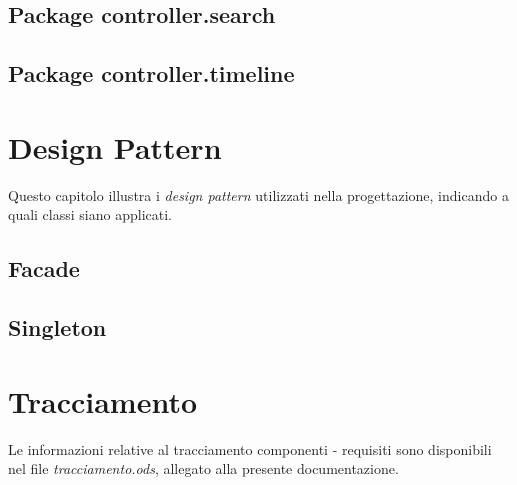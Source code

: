 \documentclass[10pt,a4paper,headinclude,footinclude,hidelinks]{scrreprt} %
\begin{document}
	\section{Package controller.search}
	\label{ch:stage:design:sistema:controller.search}

	\section{Package controller.timeline}
	\label{ch:stage:design:sistema:controller.timeline}

	\chapter{Design Pattern}
	\label{ch:stage:design:pattern}
	Questo capitolo illustra i \textit{design pattern} utilizzati nella progettazione, indicando a quali classi siano applicati.

	\section{Facade}
	\label{ch:stage:design:pattern:facade}

	\section{Singleton}
	\label{ch:stage:design:pattern:singleton}

	\chapter{Tracciamento}
	\label{ch:stage:design:tracciamento}
	Le informazioni relative al tracciamento componenti - requisiti sono disponibili nel file \textit{tracciamento.ods}, allegato alla presente documentazione.
\end{document}
